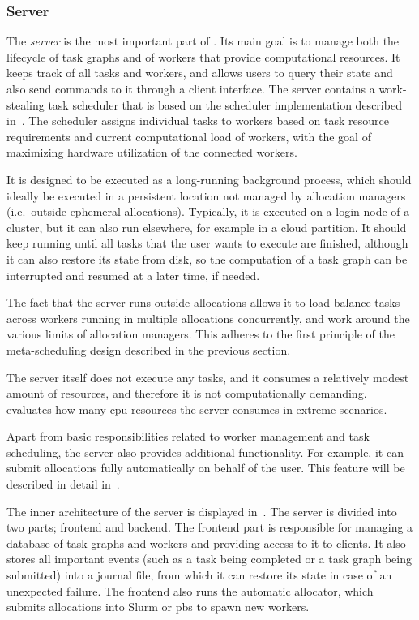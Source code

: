 \subsubsection*{Server}
The \emph{server} is the most important part of \hyperqueue{}. Its main goal is
to manage both the lifecycle of task graphs and of workers that provide computational resources. It
keeps track of all tasks and workers, and allows users to query their state and also send commands
to it through a client interface. The server contains a work-stealing task scheduler that is based
on the \rsds{} scheduler implementation described in~. The
scheduler assigns individual tasks to workers based on task resource requirements and current
computational load of workers, with the goal of maximizing hardware utilization of the connected
workers.

It is designed to be executed as a long-running background process, which should ideally be
executed in a persistent location not managed by allocation managers (i.e.\ outside ephemeral
allocations). Typically, it is executed on a login node of a cluster, but it can also run
elsewhere, for example in a cloud partition. It should keep running until all tasks that the user
wants to execute are finished, although it can also restore its state from disk, so the computation
of a task graph can be interrupted and resumed at a later time, if needed.

The fact that the server runs outside allocations allows it to load balance tasks across workers
running in multiple allocations concurrently, and work around the various limits of allocation
managers. This adheres to the first principle of the meta-scheduling design described in the
previous section.

The server itself does not execute any tasks, and it consumes a relatively modest amount of
resources, and therefore it is not computationally demanding.~ evaluates how
many \gls{cpu} resources the server consumes in extreme scenarios.

Apart from basic responsibilities related to worker management and task scheduling, the server also
provides additional functionality. For example, it can submit allocations fully automatically on
behalf of the user. This feature will be described in detail in~.

The inner architecture of the server is displayed in~. The server is divided
into two parts; frontend and backend. The frontend part is responsible for managing a database of
task graphs and workers and providing access to it to clients. It also stores all important events
(such as a task being completed or a task graph being submitted) into a journal file, from which it
can restore its state in case of an unexpected failure. The frontend also runs the automatic
allocator, which submits allocations into Slurm or \gls{pbs} to spawn new workers.

